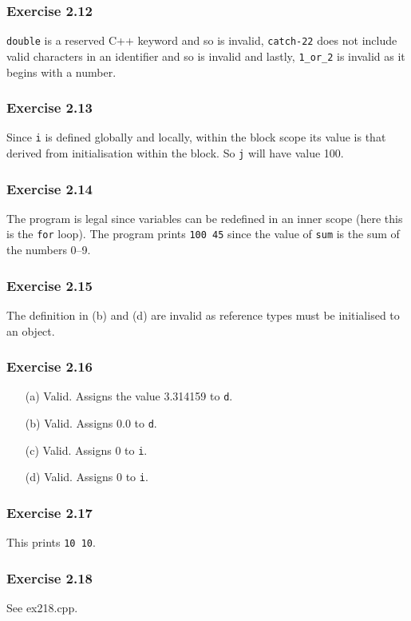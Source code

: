 \documentclass[12pt, a4paper]{article}
\begin{document}
\subsubsection*{Exercise 2.12}
\texttt{double} is a reserved C++ keyword and so is invalid, \texttt{catch-22} does not include valid characters in an identifier and so is invalid and lastly, \texttt{1\_or\_2} is invalid as it begins with a number.

\subsubsection*{Exercise 2.13}
Since \texttt{i} is defined globally and locally, within the block scope its value is that derived from initialisation within the block. So \texttt{j} will have value 100.

\subsubsection*{Exercise 2.14}
The program is legal since variables can be redefined in an inner scope (here this is the \texttt{for} loop). The program prints \texttt{100 45} since the value of \texttt{sum} is the sum of the numbers 0--9.

\subsubsection*{Exercise 2.15}
The definition in (b) and (d) are invalid as reference types must be initialised to an object.

\subsubsection*{Exercise 2.16}
\begin{itemize}
	\item [(a)]
		Valid. Assigns the value 3.314159 to \texttt{d}.
	\item [(b)]
		Valid. Assigns 0.0 to \texttt{d}.
	\item [(c)]
		Valid. Assigns 0 to \texttt{i}.
	\item [(d)]
		Valid. Assigns 0 to \texttt{i}.
\end{itemize}

\subsubsection*{Exercise 2.17}
This prints \texttt{10 10}.

\subsubsection*{Exercise 2.18}
See ex218.cpp.
\end{document}
